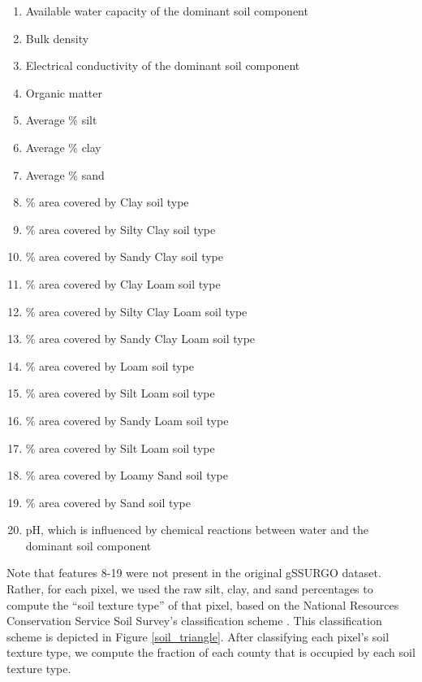 \begin{enumerate}
    \item Available water capacity of the dominant soil component
    \item Bulk density
    \item Electrical conductivity of the dominant soil component
    \item Organic matter
    \item Average \% silt
    \item Average \% clay
    \item Average \% sand
    \item \% area covered by Clay soil type
    \item \% area covered by Silty Clay soil type
    \item \% area covered by Sandy Clay soil type
    \item \% area covered by Clay Loam soil type
    \item \% area covered by Silty Clay Loam soil type
    \item \% area covered by Sandy Clay Loam soil type
    \item \% area covered by Loam soil type
    \item \% area covered by Silt Loam soil type
    \item \% area covered by Sandy Loam soil type
    \item \% area covered by Silt Loam soil type
    \item \% area covered by Loamy Sand soil type
    \item \% area covered by Sand soil type
    \item pH, which is influenced by chemical reactions between water and the dominant soil component
\end{enumerate}
Note that features 8-19 were not present in the original gSSURGO dataset. Rather, for each pixel, we used the raw silt, clay, and sand percentages to compute the ``soil texture type'' of that pixel, based on the National Resources Conservation Service Soil Survey's classification scheme \cite{soiltexture}. This classification scheme is depicted in Figure \ref{soil_triangle}. After classifying each pixel's soil texture type, we compute the fraction of each county that is occupied by each soil texture type.

